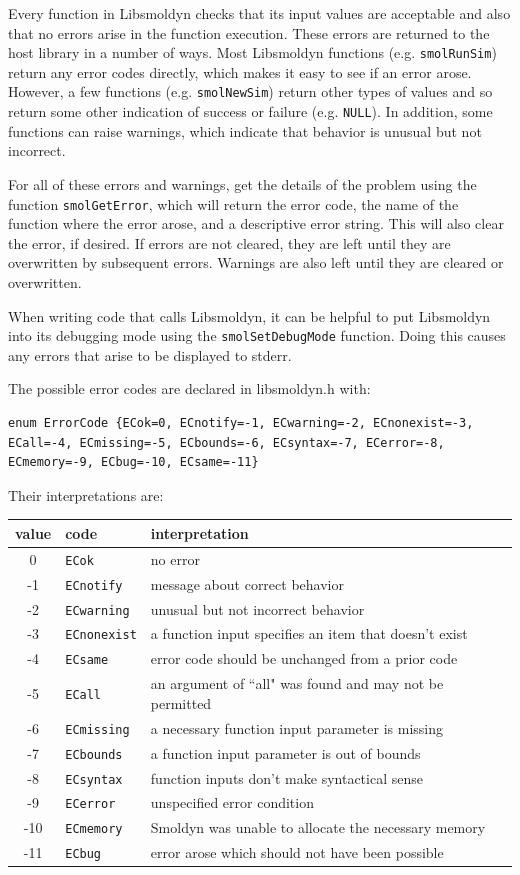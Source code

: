 \documentclass {scrbook}
\newcommand {\ttt} {\texttt}
\begin{document}
Every function in Libsmoldyn checks that its input values are acceptable and also that no errors arise in the function execution. These errors are returned to the host library in a number of ways. Most Libsmoldyn functions (e.g. \ttt{smolRunSim}) return any error codes directly, which makes it easy to see if an error arose. However, a few functions (e.g. \ttt{smolNewSim}) return other types of values and so return some other indication of success or failure (e.g. \ttt{NULL}). In addition, some functions can raise warnings, which indicate that behavior is unusual but not incorrect.

For all of these errors and warnings, get the details of the problem using the function \ttt{smolGetError}, which will return the error code, the name of the function where the error arose, and a descriptive error string. This will also clear the error, if desired. If errors are not cleared, they are left until they are overwritten by subsequent errors. Warnings are also left until they are cleared or overwritten.

When writing code that calls Libsmoldyn, it can be helpful to put Libsmoldyn into its debugging mode using the \ttt{smolSetDebugMode} function. Doing this causes any errors that arise to be displayed to stderr.

The possible error codes are declared in libsmoldyn.h with:

\begin{lstlisting}[style=SSAC]
enum ErrorCode {ECok=0, ECnotify=-1, ECwarning=-2, ECnonexist=-3, ECall=-4, ECmissing=-5, ECbounds=-6, ECsyntax=-7, ECerror=-8, ECmemory=-9, ECbug=-10, ECsame=-11}
\end{lstlisting}

Their interpretations are:

\begin{longtable}[c]{cll}
value & code & interpretation\\
\hline
0 & \ttt{ECok} & no error\\
-1 & \ttt{ECnotify} & message about correct behavior\\
-2 & \ttt{ECwarning} & unusual but not incorrect behavior\\
-3 & \ttt{ECnonexist} & a function input specifies an item that doesn't exist\\
-4 & \ttt{ECsame} & error code should be unchanged from a prior code\\
-5 & \ttt{ECall} & an argument of ``all" was found and may not be permitted\\
-6 & \ttt{ECmissing} & a necessary function input parameter is missing\\
-7 & \ttt{ECbounds} & a function input parameter is out of bounds\\
-8 & \ttt{ECsyntax} & function inputs don't make syntactical sense\\
-9 & \ttt{ECerror} & unspecified error condition\\
-10 & \ttt{ECmemory} & Smoldyn was unable to allocate the necessary memory\\
-11 & \ttt{ECbug} & error arose which should not have been possible\\

\end{longtable}
\end{document}
